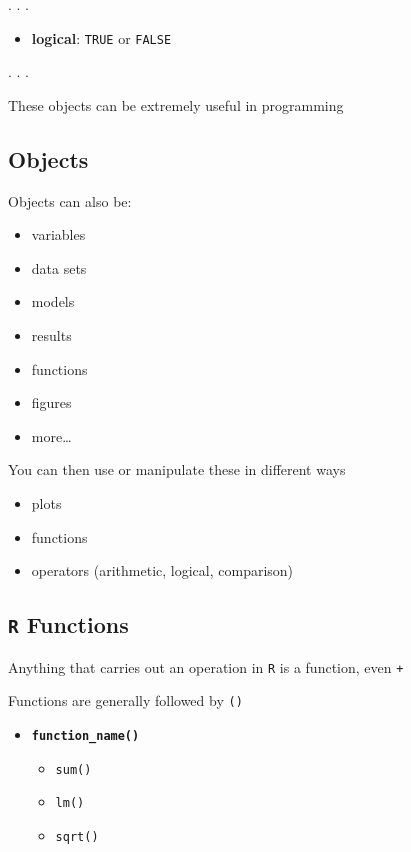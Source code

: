 \documentclass[
  letterpaper,
  DIV=11,
  numbers=noendperiod,
  oneside]{scrartcl}
\providecommand{\tightlist}{%
  \setlength{\itemsep}{0pt}\setlength{\parskip}{0pt}}\usepackage{longtable,booktabs,array}
\begin{document}
. . .

\begin{itemize}
\tightlist
\item
  \textbf{logical}: \texttt{TRUE} or \texttt{FALSE}
\end{itemize}

. . .

These objects can be extremely useful in programming

\hypertarget{objects}{%
\subsection{Objects}\label{objects}}

Objects can also be:

\begin{itemize}
\tightlist
\item
  variables
\item
  data sets
\item
  models
\item
  results
\item
  functions
\item
  figures
\item
  more\ldots{}
\end{itemize}

You can then use or manipulate these in different ways

\begin{itemize}
\tightlist
\item
  plots
\item
  functions
\item
  operators (arithmetic, logical, comparison)
\end{itemize}

\hypertarget{r-functions}{%
\subsection{\texorpdfstring{\texttt{R}
Functions}{R Functions}}\label{r-functions}}

Anything that carries out an operation in \texttt{R} is a function, even
\texttt{+}

Functions are generally followed by \texttt{()}

\begin{itemize}
\item
  \textbf{\texttt{function\_name()}}

  \begin{itemize}
  \tightlist
  \item
    \texttt{sum()}
  \item
    \texttt{lm()}
  \item
    \texttt{sqrt()}
  \end{itemize}
\end{itemize}
\end{document}
